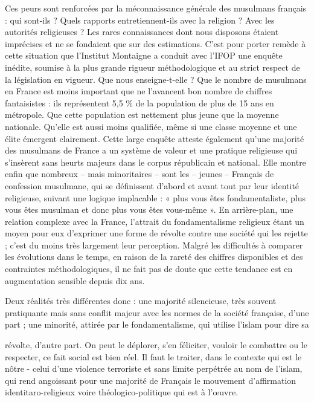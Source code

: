 Ces peurs sont renforcées par la méconnaissance générale des musulmans
français : qui sont-ils ? Quels rapports entretiennent-ils avec la
religion ? Avec les autorités religieuses ? Les rares connaissances dont
nous disposons étaient imprécises et ne se fondaient que sur des
estimations. C'est pour porter remède à cette situation que l'Institut
Montaigne a conduit avec l'IFOP une enquête inédite, soumise à la plus
grande rigueur méthodologique et au strict respect de la législation en
vigueur. Que nous enseigne-t-elle ? Que le nombre de musulmans en France
est moins important que ne l'avancent bon nombre de chiffres
fantaisistes : ils représentent 5,5 \% de la population de plus de 15
ans en métropole. Que cette population est nettement plus jeune que la
moyenne nationale. Qu'elle est aussi moins qualifiée, même si une classe
moyenne et une élite émergent clairement. Cette large enquête atteste
également qu'une majorité des musulmans de France a un système de valeur
et une pratique religieuse qui s'insèrent sans heurts majeurs dans le
corpus républicain et national. Elle montre enfin que nombreux -- mais
minoritaires -- sont les -- jeunes -- Français de confession musulmane,
qui se définissent d'abord et avant tout par leur identité religieuse,
suivant une logique implacable : « plus vous êtes fondamentaliste, plus
vous êtes musulman et donc plus vous êtes vous-même ». En arrière-plan,
une relation complexe avec la France, l'attrait du fondamentalisme
religieux étant un moyen pour eux d'exprimer une forme de révolte contre
une société qui les rejette ; c'est du moins très largement leur
perception. Malgré les difficultés à comparer les évolutions dans le
temps, en raison de la rareté des chiffres disponibles et des
contraintes méthodologiques, il ne fait pas de doute que cette tendance
est en augmentation sensible depuis dix ans.

Deux réalités très différentes donc : une majorité silencieuse, très
souvent pratiquante mais sans conflit majeur avec les normes de la
société française, d'une part ; une minorité, attirée par le
fondamentalisme, qui utilise l'islam pour dire sa



révolte, d'autre part. On peut le déplorer, s'en féliciter, vouloir le
combattre ou le respecter, ce fait social est bien réel. Il faut le
traiter, dans le contexte qui est le nôtre - celui d'une violence
terroriste et sans limite perpétrée au nom de l'islam, qui rend
angoissant pour une majorité de Français le mouvement d'affirmation
identitaro-religieux voire théologico-politique qui est à l'œuvre.

